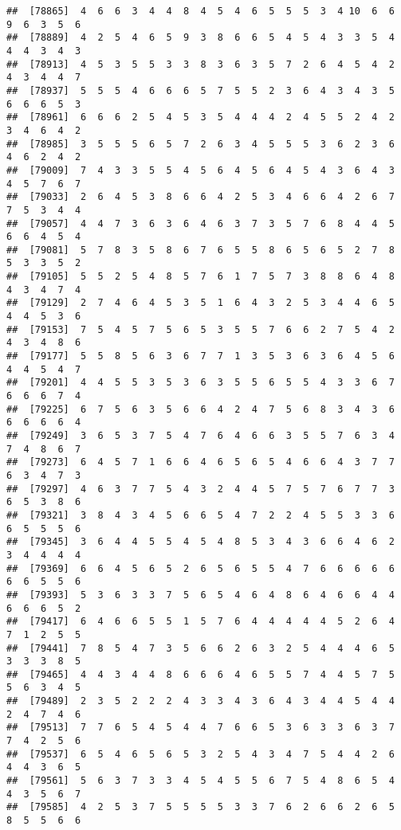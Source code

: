 \documentclass[
]{book}
\begin{document}
\begin{verbatim}
##  [78865]  4  6  6  3  4  4  8  4  5  4  6  5  5  5  3  4 10  6  6  9  6  3  5  6
##  [78889]  4  2  5  4  6  5  9  3  8  6  6  5  4  5  4  3  3  5  4  4  4  3  4  3
##  [78913]  4  5  3  5  5  3  3  8  3  6  3  5  7  2  6  4  5  4  2  4  3  4  4  7
##  [78937]  5  5  5  4  6  6  6  5  7  5  5  2  3  6  4  3  4  3  5  6  6  6  5  3
##  [78961]  6  6  6  2  5  4  5  3  5  4  4  4  2  4  5  5  2  4  2  3  4  6  4  2
##  [78985]  3  5  5  5  6  5  7  2  6  3  4  5  5  5  3  6  2  3  6  4  6  2  4  2
##  [79009]  7  4  3  3  5  5  4  5  6  4  5  6  4  5  4  3  6  4  3  4  5  7  6  7
##  [79033]  2  6  4  5  3  8  6  6  4  2  5  3  4  6  6  4  2  6  7  7  5  3  4  4
##  [79057]  4  4  7  3  6  3  6  4  6  3  7  3  5  7  6  8  4  4  5  6  6  4  5  4
##  [79081]  5  7  8  3  5  8  6  7  6  5  5  8  6  5  6  5  2  7  8  5  3  3  5  2
##  [79105]  5  5  2  5  4  8  5  7  6  1  7  5  7  3  8  8  6  4  8  4  3  4  7  4
##  [79129]  2  7  4  6  4  5  3  5  1  6  4  3  2  5  3  4  4  6  5  4  4  5  3  6
##  [79153]  7  5  4  5  7  5  6  5  3  5  5  7  6  6  2  7  5  4  2  4  3  4  8  6
##  [79177]  5  5  8  5  6  3  6  7  7  1  3  5  3  6  3  6  4  5  6  4  4  5  4  7
##  [79201]  4  4  5  5  3  5  3  6  3  5  5  6  5  5  4  3  3  6  7  6  6  6  7  4
##  [79225]  6  7  5  6  3  5  6  6  4  2  4  7  5  6  8  3  4  3  6  6  6  6  6  4
##  [79249]  3  6  5  3  7  5  4  7  6  4  6  6  3  5  5  7  6  3  4  7  4  8  6  7
##  [79273]  6  4  5  7  1  6  6  4  6  5  6  5  4  6  6  4  3  7  7  6  3  4  7  3
##  [79297]  4  6  3  7  7  5  4  3  2  4  4  5  7  5  7  6  7  7  3  6  5  3  8  6
##  [79321]  3  8  4  3  4  5  6  6  5  4  7  2  2  4  5  5  3  3  6  6  5  5  5  6
##  [79345]  3  6  4  4  5  5  4  5  4  8  5  3  4  3  6  6  4  6  2  3  4  4  4  4
##  [79369]  6  6  4  5  6  5  2  6  5  6  5  5  4  7  6  6  6  6  6  6  6  5  5  6
##  [79393]  5  3  6  3  3  7  5  6  5  4  6  4  8  6  4  6  6  4  4  6  6  6  5  2
##  [79417]  6  4  6  6  5  5  1  5  7  6  4  4  4  4  4  5  2  6  4  7  1  2  5  5
##  [79441]  7  8  5  4  7  3  5  6  6  2  6  3  2  5  4  4  4  6  5  3  3  3  8  5
##  [79465]  4  4  3  4  4  8  6  6  6  4  6  5  5  7  4  4  5  7  5  5  6  3  4  5
##  [79489]  2  3  5  2  2  2  4  3  3  4  3  6  4  3  4  4  5  4  4  2  4  7  4  6
##  [79513]  7  7  6  5  4  5  4  4  7  6  6  5  3  6  3  3  6  3  7  7  4  2  5  6
##  [79537]  6  5  4  6  5  6  5  3  2  5  4  3  4  7  5  4  4  2  6  4  4  3  6  5
##  [79561]  5  6  3  7  3  3  4  5  4  5  5  6  7  5  4  8  6  5  4  4  3  5  6  7
##  [79585]  4  2  5  3  7  5  5  5  5  3  3  7  6  2  6  6  2  6  5  8  5  5  6  6

\end{verbatim}
\end{document}
